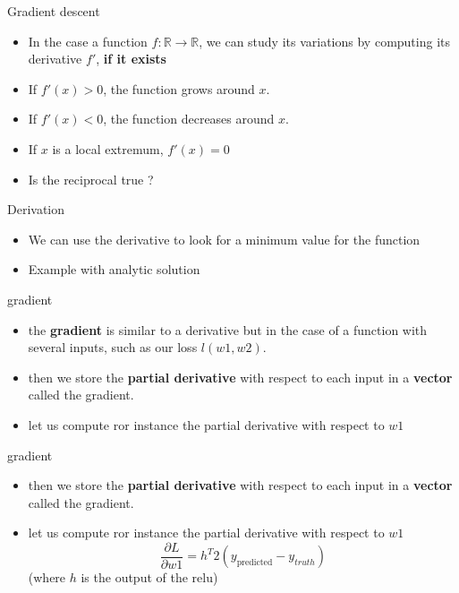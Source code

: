 \documentclass{beamer}
\begin{document}
\begin{frame}{Gradient descent}
    \begin{itemize}
        \item In the case a function $ f : \mathbb{R}  \rightarrow
            \mathbb{R}$, we can study its variations by computing its
            derivative $f'$, \textbf{{if it exists}}
        \item If $f'(x)>0$, the function grows around $x$.
        \item If $f'(x)<0$, the function decreases around $x$.
        \item If $x$ is a local extremum, $f'(x)=0$
        \item Is the reciprocal true ?
    \end{itemize}
\end{frame}

\begin{frame}{Derivation}
   \begin{itemize}
       \item We can use the derivative to look for a minimum value for the
           function
        \item Example with analytic solution
   \end{itemize} 
\end{frame}

\begin{frame}{gradient}
   \begin{itemize}
       \item the \textbf{{gradient}} is similar to a derivative but in the case
           of a function with several inputs, such as our loss $l(w1,w2)$.
    \item then we store the \textbf{{partial derivative}} with respect to each
        input in a \textbf{{vector}} called the gradient. 
    \item let us compute ror instance the partial derivative with respect to $w1$ 
   \end{itemize} 
\end{frame}


\begin{frame}{gradient}
   \begin{itemize}
    \item then we store the \textbf{{partial derivative}} with respect to each
        input in a \textbf{{vector}} called the gradient. 
    \item let us compute ror instance the partial derivative with respect to $w1$ 
        \begin{equation}
            \frac{\partial L}{\partial w1}=  h^T  2(y_{\text{predicted}}-y_{{truth}})  
        \end{equation}
           (where $h$ is the output of the relu)
   \end{itemize} 
\end{frame}
\end{document}

